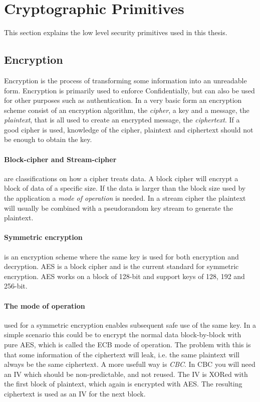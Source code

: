 \documentclass[pdftex,english,10pt,b5paper,twoside]{book}
\begin{document}
\section{Cryptographic Primitives}

This section explains the low level security primitives used in this thesis.

\subsection{Encryption}

Encryption is the process of transforming some
information into an unreadable form. Encryption is primarily used to enforce
Confidentially, but can also be used for other purposes such as authentication.
In a very basic form an encryption scheme consist of an encryption algorithm,
the \emph{cipher}, a key and a message, the \emph{plaintext}, that is all used
to create an encrypted message, the \emph{ciphertext}. If a good cipher is
used, knowledge of the cipher, plaintext and ciphertext should not be enough to
obtain the key.

\paragraph{Block-cipher and Stream-cipher} are classifications on how a cipher
treats data\cite[p. 32]{stallings}. A block cipher will encrypt a block of data
of a specific size. If the data is larger than the block size used by the
application a \emph{mode of operation} is needed. In a stream cipher the
plaintext will usually be combined with a pseudorandom key stream to generate
the plaintext.

\paragraph{Symmetric encryption} is an encryption scheme where the same key is
used for both encryption and decryption\cite[p. 32]{stallings}. \ac{AES} is a
block cipher and is the current standard for symmetric encryption. \ac{AES}
works on a block of 128-bit and support keys of 128, 192 and 256-bit.

\paragraph{The mode of operation} used for a symmetric encryption enables
subsequent safe use of the same key. In a simple scenario this could be to
encrypt the normal data block-by-block with pure \ac{AES}, which is called the
\ac{ECB} mode of operation. The problem with this is that some information of
the ciphertext will leak, i.e. the same plaintext will always be the same
ciphertext. A more usefull way is \emph{\ac{CBC}}. In \ac{CBC} you will need an
\ac{IV} which should be non-predictable, and not reused. The \ac{IV} is XORed
with the first block of plaintext, which again is encrypted with \ac{AES}. The
resulting ciphertext is used as an \ac{IV} for the next block.
\end{document}
